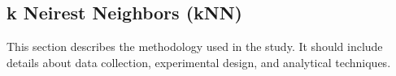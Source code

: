 \subsection{k Neirest Neighbors (kNN)}
\label{subsec:knn}

This section describes the methodology used in the study. It should include details about data collection, experimental design, and analytical techniques.


